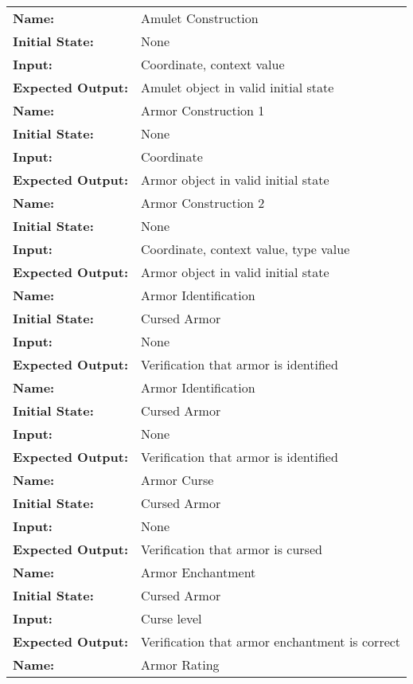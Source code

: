 \documentclass[12pt, titlepage]{article}
\begin{document}
\begin{center}

\begin{longtable}{ l | l }
\hline
\textbf{Name:} & Amulet Construction\\
\textbf{Initial State:} & None\\
\textbf{Input:} & Coordinate, context value\\
\textbf{Expected Output:} & Amulet object in valid initial state\\
\hline
\textbf{Name:} & Armor Construction 1\\
\textbf{Initial State:} & None\\
\textbf{Input:} & Coordinate\\
\textbf{Expected Output:} & Armor object in valid initial state\\
\hline
\textbf{Name:} & Armor Construction 2\\
\textbf{Initial State:} & None\\
\textbf{Input:} & Coordinate, context value, type value\\
\textbf{Expected Output:} & Armor object in valid initial state\\
\hline
\textbf{Name:} & Armor Identification\\
\textbf{Initial State:} & Cursed Armor\\
\textbf{Input:} & None\\
\textbf{Expected Output:} & Verification that armor is identified\\
\hline
\textbf{Name:} & Armor Identification\\
\textbf{Initial State:} & Cursed Armor\\
\textbf{Input:} & None\\
\textbf{Expected Output:} & Verification that armor is identified\\
\hline
\textbf{Name:} & Armor Curse\\
\textbf{Initial State:} & Cursed Armor\\
\textbf{Input:} & None\\
\textbf{Expected Output:} & Verification that armor is cursed\\
\hline
\textbf{Name:} & Armor Enchantment\\
\textbf{Initial State:} & Cursed Armor\\
\textbf{Input:} & Curse level\\
\textbf{Expected Output:} & Verification that armor enchantment is correct\\
\hline
\textbf{Name:} & Armor Rating\\

\end{longtable}
\end{center}
\end{document}
